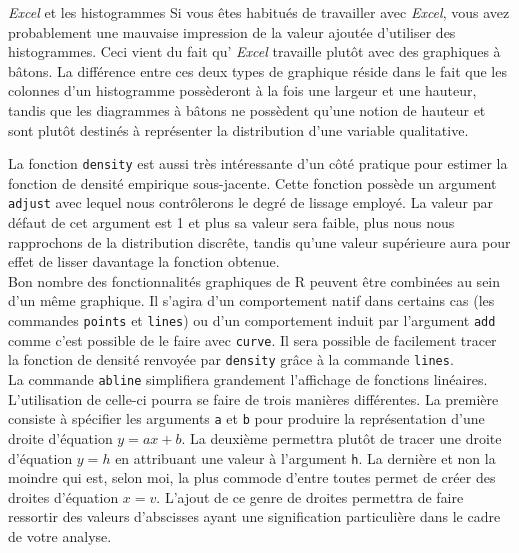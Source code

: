 \begin{moreInfo}{\emph{Excel} et les histogrammes}
	Si vous êtes habitués de travailler avec \emph{Excel}, vous avez probablement une mauvaise impression de la valeur ajoutée d'utiliser des histogrammes. Ceci vient du fait qu’ \emph{Excel} travaille plutôt avec des graphiques à bâtons. La différence entre ces deux types de graphique réside dans le fait que les colonnes d'un histogramme possèderont à la fois une largeur et une hauteur, tandis que les diagrammes à bâtons ne possèdent qu'une notion de hauteur et sont plutôt destinés à représenter la distribution d'une variable qualitative. 
\end{moreInfo}

La fonction \texttt{density} \cite{Rfunction:density} est aussi très intéressante d'un côté pratique pour estimer la fonction de densité empirique sous-jacente. Cette fonction possède un argument \texttt{adjust} avec lequel nous contrôlerons le degré de lissage employé. La valeur par défaut de cet argument est 1 et plus sa valeur sera faible, plus nous nous rapprochons de la distribution discrête, tandis qu'une valeur supérieure aura pour effet de lisser davantage la fonction obtenue. \\

Bon nombre des fonctionnalités graphiques de R peuvent être combinées au sein d'un même graphique. Il s'agira d'un comportement natif dans certains cas (les commandes \texttt{points} et \texttt{lines}) ou d'un comportement induit par l'argument \texttt{add} comme c'est possible de le faire avec \texttt{curve}. Il sera possible de facilement tracer la fonction de densité renvoyée par \texttt{density} grâce à la commande \texttt{lines}. \\

La commande \texttt{abline} \cite{Rfunction:abline} simplifiera grandement l'affichage de fonctions linéaires. L'utilisation de celle-ci pourra se faire de trois manières différentes. La première consiste à spécifier les arguments \texttt{a} et \texttt{b} pour produire la représentation d'une droite d'équation $y = ax + b$. La deuxième permettra plutôt de tracer une droite d'équation $y = h$ en attribuant une valeur à l'argument \texttt{h}. La dernière et non la moindre qui est, selon moi, la plus commode d'entre toutes permet de créer des droites d'équation $x = v$. L'ajout de ce genre de droites permettra de faire ressortir des valeurs d'abscisses ayant une signification particulière dans le cadre de votre analyse. \\

